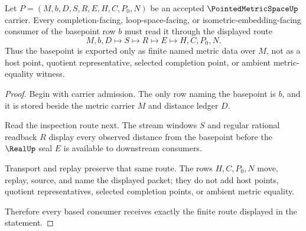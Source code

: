 \begin{theorem}
\label{thm:pointed-metric-space-basepoint-nonescape}
Let $P=(M,b,D,S,R,E,H,C,P_0,N)$ be an accepted
$\PointedMetricSpaceUp$ carrier. Every completion-facing, loop-space-facing,
or isometric-embedding-facing consumer of the basepoint row $b$ must read it
through the displayed route
$$
M,b,D \longmapsto S \longmapsto R \longmapsto E \longmapsto H,C,P_0,N .
$$
Thus the basepoint is exported only as finite named metric data over $M$, not
as a host point, quotient representative, selected completion point, or
ambient metric-equality witness.
\end{theorem}
\begin{proof}
Begin with carrier admission. The only row naming the basepoint is $b$, and it
is stored beside the metric carrier $M$ and distance ledger $D$.

Read the inspection route next. The stream windows $S$ and regular rational
readback $R$ display every observed distance from the basepoint before the
$\RealUp$ seal $E$ is available to downstream consumers.

Transport and replay preserve that same route. The rows $H,C,P_0,N$ move,
replay, source, and name the displayed packet; they do not add host points,
quotient representatives, selected completion points, or ambient metric
equality.

Therefore every based consumer receives exactly the finite route displayed in
the statement.
\end{proof}


\begin{closurestatus}{\PointedMetricSpaceUp}
  \theoryclosure{\seedClosure}
  \formalstatus{\theoremCheckedV}
\end{closurestatus}
